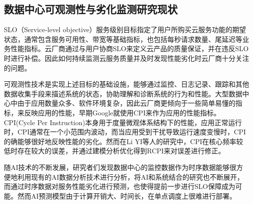 
\subsection{数据中心可观测性与劣化监测研究现状}


SLO（Service-level objective）服务级别目标指定了用户所购买云服务功能的期望状态，通常包含服务可用性、带宽等基础指标，也包括每秒请求数量、尾延迟等业务性能指标。云厂商通过与用户协商SLO来定义云产品的质量保证，并在违反SLO时进行补偿。因此如何持续监测云服务质量并及时发现性能劣化时云厂商十分关注的问题。

可观测性技术是实现上述目标的基础设施，能够通过监控、日志记录、跟踪和其他数据收集手段来描述系统的状态，协助理解和诊断系统的行为和性能。大型数据中心中由于应用数量众多、软件环境复杂，因此云厂商更倾向于一些简单易懂的指标，来反映应用的性能，早期Google就使用CPI来作为应用的性能指标\citep{zhang2013cpi2}。CPI(Cycle Per Instruction)本身用于度量微观体系结构下的性能，应用正常运行时，CPI通常在一个小范围内波动，而当应用受到干扰导致运行速度变慢时，CPI的确能够很好地反映性能的劣化。然而在Li YI等人的研究中\citep{yi2020cpi}，CPI在核心频率较低时存在较大的误差，并通过建模分析优化得到RCPI来对误差进行修正。

随AI技术的不断发展，研究者们发现数据中心的监控数据作为时序数据能够很方便地利用现有的AI数据分析技术进行分析，将AI和系统结合的研究也不断展开，而通过时序数据对服务性能劣化进行预测\citep{qiu2020firm, zhou2022aquatope, wang2022deepscaling, gan2021sage}，也使得提前一步进行SLO保障成为可能。然而AI预测模型由于计算开销大、时间长，在单点调度上很难进行部署。

